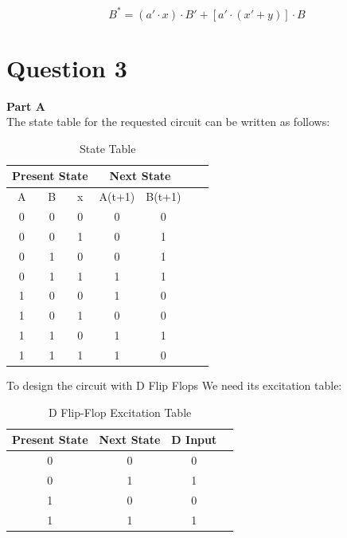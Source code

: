 \documentclass[table ]{article}
\begin{document}
    \begin{equation}
        B^* = (a' \cdot x) \cdot B' + [a' \cdot (x' + y)] \cdot B
    \end{equation}
    
    
\newpage



\section{Question 3}

\textbf{Part A} \\


The state table for the requested circuit can be written as follows:

    
\begin{table}[H]
    \centering
    \caption{State Table}

    \begin{tabular}{|c|c|c|c|c|c|c|}
        \hline
        \multicolumn{3}{|c|}{Present State} & \multicolumn{2}{c|}{Next State} \\
        \hline
        A & B & x & A(t+1) & B(t+1)  \\
        \hline
        0 & 0 & 0 & 0 & 0 \\
        0 & 0 & 1 & 0 & 1 \\
        \hline
        0 & 1 & 0 & 0 & 1 \\
        0 & 1 & 1 & 1 & 1 \\
        \hline
        1 & 0 & 0 & 1 & 0 \\
        1 & 0 & 1 & 0 & 0 \\
        \hline
        1 & 1 & 0 & 1 & 1 \\
        1 & 1 & 1 & 1 & 0 \\
        \hline
\end{tabular}
\end{table}


To design the circuit with D Flip Flops We need its excitation table:

\begin{table}[H]
    \centering
    \caption{D Flip-Flop Excitation Table}
    \begin{tabular}{|c|c|c|c|}
        \hline
        Present State & Next State & D Input \\
        \hline
        0 & 0 & 0 \\
        0 & 1 & 1 \\
        1 & 0 & 0 \\
        1 & 1 & 1 \\
        \hline
    \end{tabular}
\end{table}
\end{document}
